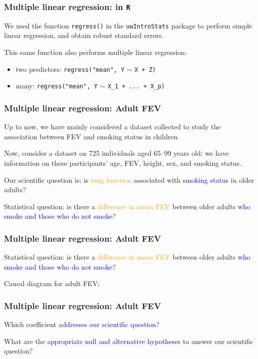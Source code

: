 \documentclass[12pt, 
hyperref={colorlinks=true, linkcolor=blue, urlcolor=cyan}]{beamer}
\begin{document}
\begin{frame}
\frametitle{Multiple linear regression: in \texttt{R}}

We used the function \texttt{regress()} in the \texttt{uwIntroStats} package to perform simple linear regression, and obtain robust standard errors.

This same function also performs multiple linear regression: 
\begin{itemize}
\item two predictors: \texttt{regress("mean", Y} $\sim$ \texttt{X + Z)}
\item many: \texttt{regress("mean", Y} $\sim$ \texttt{X\_1 + ... + X\_p)}
\end{itemize}
\end{frame}

\begin{frame}
\frametitle{Multiple linear regression: Adult FEV}

Up to now, we have mainly considered a dataset collected to study the association between FEV and smoking status in children.

Now, consider a dataset on 725 individuals aged 65--99 years old: we have information on these participants' age, FEV, height, sex, and smoking status.

Our scientific question is: is \textcolor{orange}{lung function} associated with \textcolor{blue}{smoking status} in older adults?

Statistical question: is there a \textcolor{orange}{difference in mean FEV} between older adults \textcolor{blue}{who smoke and those who do not smoke}?
\end{frame}

\begin{frame}
\frametitle{Multiple linear regression: Adult FEV}
Statistical question: is there a \textcolor{orange}{difference in mean FEV} between older adults \textcolor{blue}{who smoke and those who do not smoke}?

Causal diagram for adult FEV: \vspace{5cm}

\end{frame}

\begin{frame}
\frametitle{Multiple linear regression: Adult FEV}

Which coefficient \textcolor{blue}{addresses our scientific question}? \vspace{0.5cm}

What are the \textcolor{blue}{appropriate null and alternative hypotheses} to answer our scientific question?

\end{frame}
\end{document}
